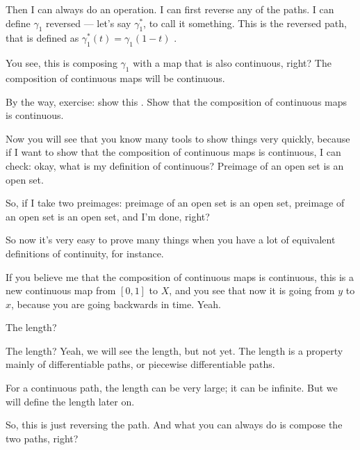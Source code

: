 \begin{proofWrapper}
\begin{speech}[00:55:55 - 00:57:45]
Then I can always do an operation. I can first reverse any of the paths. I can define $\gamma_1$ reversed  --- let's say $\gamma_1^*$, to call it something. This is the reversed path, that is defined as $\gamma_1^*(t) = \gamma_1(1 - t)$ .

You see, this is composing $\gamma_1$ with a map that is also continuous, right? The composition of continuous maps will be continuous.

By the way, exercise: show this . Show that the composition of continuous maps is continuous.

Now you will see that you know many tools to show things very quickly, because if I want to show that the composition of continuous maps is continuous, I can check: okay, what is my definition of continuous? Preimage of an open set is an open set.

So, if I take two preimages: preimage of an open set is an open set, preimage of an open set is an open set, and I'm done, right?

So now it's very easy to prove many things when you have a lot of equivalent definitions of continuity, for instance.

If you believe me that the composition of continuous maps is continuous, this is a new continuous map from $[0, 1]$ to $X$, and you see that now it is going from $y$ to $x$, because you are going backwards in time. Yeah.
\end{speech}

\begin{student}
The length?
\end{student}

\begin{speech}[00:58:09 - 00:58:35]
The length? Yeah, we will see the length, but not yet. The length is a property mainly of differentiable paths, or piecewise differentiable paths.

For a continuous path, the length can be very large; it can be infinite. But we will define the length later on.
\end{speech}

\begin{speech}[00:58:35 - 01:00:18]
So, this is just reversing the path. And what you can always do is compose the two paths, right?


\end{speech}
\end{proofWrapper}
